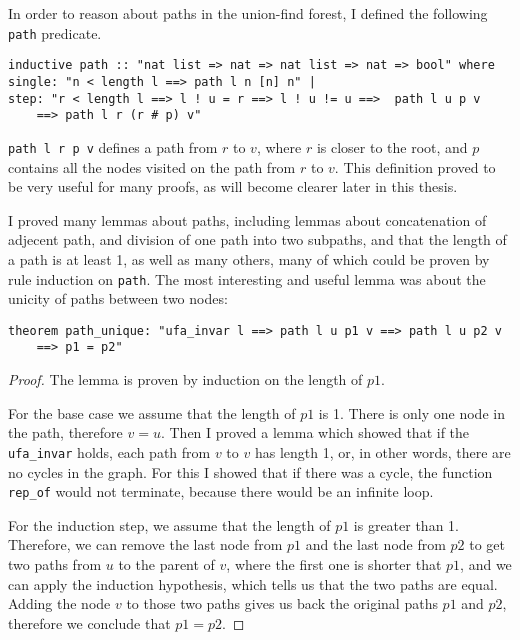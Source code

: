 In order to reason about paths in the union-find forest, I defined the following \lstinline{path} predicate.

\begin{lstlisting}
inductive path :: "nat list => nat => nat list => nat => bool" where
single: "n < length l ==> path l n [n] n" |
step: "r < length l ==> l ! u = r ==> l ! u != u ==>  path l u p v 
	==> path l r (r # p) v"
\end{lstlisting}

\lstinline{path l r p v} defines a path from $r$ to $v$, where $r$ is closer to the root, and $p$ contains all the nodes visited on the path from $r$ to $v$. This definition proved to be very useful for many proofs, as will become clearer later in this thesis.

I proved many lemmas about paths, including lemmas about concatenation of adjecent path, and division of one path into two subpaths, and that the length of a path is at least 1, as well as many others, many of which could be proven by rule induction on \lstinline{path}. The most interesting and useful lemma was about the unicity of paths between two nodes:

\begin{lstlisting}
theorem path_unique: "ufa_invar l ==> path l u p1 v ==> path l u p2 v 
	==> p1 = p2"
\end{lstlisting}

\begin{proof}
The lemma is proven by induction on the length of $p1$.

For the base case we assume that the length of $p1$ is 1. There is only one node in the path, therefore $v = u$. Then I proved a lemma which showed that if the \lstinline{ufa_invar} holds, each path from $v$ to $v$ has length 1, or, in other words, there are no cycles in the graph. For this I showed that if there was a cycle, the function \lstinline{rep_of} would not terminate, because there would be an infinite loop.

For the induction step, we assume that the length of $p1$ is greater than 1. Therefore, we can remove the last node from $p1$ and the last node from $p2$ to get two paths from $u$ to the parent of $v$, where the first one is shorter that $p1$, and we can apply the induction hypothesis, which tells us that the two paths are equal. Adding the node $v$ to those two paths gives us back the original paths $p1$ and $p2$, therefore we conclude that $p1 = p2$.
\end{proof}

